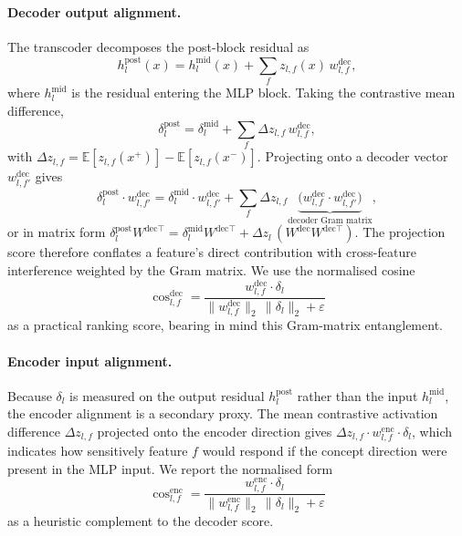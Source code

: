 \paragraph{Decoder output alignment.}
The transcoder decomposes the post-block residual as
\begin{equation}
h_l^{\mathrm{post}}(x)
= h_l^{\mathrm{mid}}(x) + \sum_f z_{l,f}(x)\,w_{l,f}^{\mathrm{dec}},
\label{eq:transcoder_decomp}
\end{equation}
where \(h_l^{\mathrm{mid}}\) is the residual entering the MLP block.
Taking the contrastive mean difference,
\begin{equation}
\delta_l^{\mathrm{post}}
= \delta_l^{\mathrm{mid}} + \sum_f \Delta z_{l,f}\,w_{l,f}^{\mathrm{dec}},
\label{eq:delta_decomp}
\end{equation}
with \(\Delta z_{l,f}=\mathbb{E}[z_{l,f}(x^+)]-\mathbb{E}[z_{l,f}(x^-)]\).
Projecting onto a decoder vector \(w_{l,f'}^{\mathrm{dec}}\) gives
\begin{equation}
\delta_l^{\mathrm{post}}\cdot w_{l,f'}^{\mathrm{dec}}
=
\delta_l^{\mathrm{mid}}\cdot w_{l,f'}^{\mathrm{dec}}
+
\sum_f \Delta z_{l,f}
\underbrace{\bigl(w_{l,f}^{\mathrm{dec}}\cdot w_{l,f'}^{\mathrm{dec}}\bigr)}_{\text{decoder Gram matrix}},
\label{eq:dec_gram}
\end{equation}
or in matrix form \(\delta_l^{\mathrm{post}} W^{\mathrm{dec}\top} = \delta_l^{\mathrm{mid}} W^{\mathrm{dec}\top} + \Delta z_l\,(W^{\mathrm{dec}}W^{\mathrm{dec}\top})\).
The projection score therefore conflates a feature's direct contribution with
cross-feature interference weighted by the Gram matrix. We use the normalised cosine
\begin{equation}
\operatorname{cos}_{l,f}^{\mathrm{dec}}
=
\frac{w_{l,f}^{\mathrm{dec}} \cdot \delta_l}
     {\lVert w_{l,f}^{\mathrm{dec}}\rVert_2\,\lVert\delta_l\rVert_2 + \varepsilon}
\label{eq:decoder_cosine}
\end{equation}
as a practical ranking score, bearing in mind this Gram-matrix entanglement.

\paragraph{Encoder input alignment.}
Because \(\delta_l\) is measured on the output residual \(h_l^{\mathrm{post}}\)
rather than the input \(h_l^{\mathrm{mid}}\), the encoder alignment is a secondary
proxy. The mean contrastive activation difference \(\Delta z_{l,f}\) projected onto the
encoder direction gives \(\Delta z_{l,f}\cdot w_{l,f}^{\mathrm{enc}}\cdot\delta_l\),
which indicates how sensitively feature \(f\) would respond if the concept direction
were present in the MLP input. We report the normalised form
\begin{equation}
\operatorname{cos}_{l,f}^{\mathrm{enc}}
=
\frac{w_{l,f}^{\mathrm{enc}} \cdot \delta_l}
     {\lVert w_{l,f}^{\mathrm{enc}}\rVert_2\,\lVert\delta_l\rVert_2 + \varepsilon}
\label{eq:encoder_cosine}
\end{equation}
as a heuristic complement to the decoder score.

